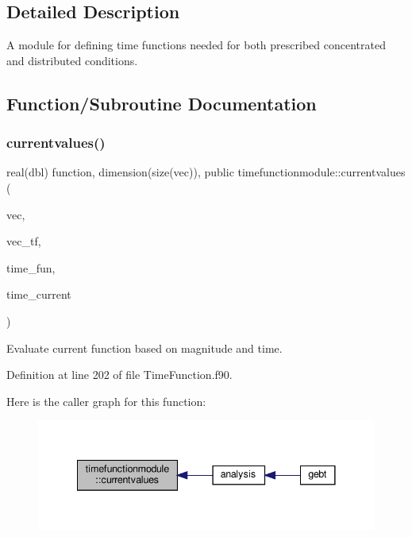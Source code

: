 \subsection{Detailed Description}
A module for defining time functions needed for both prescribed concentrated and distributed conditions. 

\subsection{Function/\+Subroutine Documentation}
\mbox{\label{namespacetimefunctionmodule_a907e0921288aa4f538e605c521686e4a}} 
\subsubsection{\texorpdfstring{currentvalues()}{currentvalues()}}
{\footnotesize\ttfamily real(dbl) function, dimension(size(vec)), public timefunctionmodule\+::currentvalues (\begin{DoxyParamCaption}\item[{real(dbl), dimension(\+:), intent(in)}]{vec,  }\item[{integer, dimension(\+:), intent(in)}]{vec\+\_\+tf,  }\item[{type (\hyperlink{structtimefunctionmodule_1_1timefunction}{timefunction}), dimension(\+:), intent(in)}]{time\+\_\+fun,  }\item[{real(dbl), intent(in)}]{time\+\_\+current }\end{DoxyParamCaption})}



Evaluate current function based on magnitude and time. 



Definition at line 202 of file Time\+Function.\+f90.

Here is the caller graph for this function\+:\nopagebreak
\begin{figure}[H]
\begin{center}
\leavevmode
\includegraphics[width=341pt]{namespacetimefunctionmodule_a907e0921288aa4f538e605c521686e4a_icgraph}
\end{center}
\end{figure}
\mbox{\label{namespacetimefunctionmodule_a177d2096c59b79cbbfd85b4e05b57f29}} 
